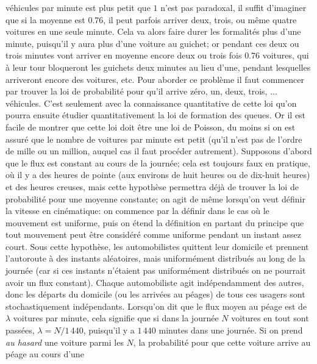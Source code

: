 v\'ehicules par minute est plus petit que $1$ n'est pas paradoxal, il suffit 
d'imaginer que si la moyenne  est $0.76$,  il peut parfois arriver deux, 
trois,  ou m\^eme quatre voitures en une seule minute.  Cela va alors faire  
durer les formalit\'es plus d'une minute,  puisqu'il y aura plus d'une  
voiture au guichet;  or pendant ces deux ou trois minutes vont 
arriver en moyenne encore deux ou trois fois $0.76$ voitures,  qui \`a
leur tour bloqueront les guichets deux minutes au lieu d'une,  pendant
lesquelles arriveront encore des voitures, etc.  
\medskip 
Pour aborder ce probl\`eme il faut commencer par trouver la loi de 
probabilit\'e pour qu'il arrive z\'ero, un, deux, trois, $\ldots$ v\'ehicules. 
C'est seulement avec la connaissance quantitative de cette loi qu'on 
pourra ensuite \'etudier quantitativement la loi de formation des queues. 
\medskip 
 Or il est facile de montrer que cette loi doit \^etre une loi de Poisson, du 
moins si on est assur\'e que le nombre de voitures par minute est petit 
(qu'il n'est pas de l'ordre de mille ou un million, auquel cas il faut 
proc\'eder autrement).  
\medskip 
Supposons d'abord que le flux est constant au cours de la journ\'ee; cela 
est toujours faux en pratique, o\`u il y a des heures de pointe 
(aux environs de huit heures ou de dix-huit heures) et des heures  
creuses, mais cette hypoth\`ese permettra d\'ej\`a de 
trouver la loi de probabilit\'e pour une moyenne constante; on agit de 
m\^eme lorsqu'on veut d\'efinir la vitesse en cin\'ematique: on commence 
par la d\'efinir  dans le cas o\`u le mouvement est uniforme, puis on 
\'etend la d\'efinition en partant du principe que tout mouvement  peut 
\^etre consid\'er\'e comme uniforme pendant un instant assez court. 
\medskip  
Sous cette hypoth\`ese, les automobilistes quittent leur 
domicile et prennent l'autoroute \`a des instants al\'eatoires,  mais 
uniform\'ement distribu\'es au long de la journ\'ee (car si ces instants 
n'\'etaient pas uniform\'ement distribu\'es on ne pourrait avoir un flux 
constant).  Chaque automobiliste agit ind\'ependamment des autres, donc 
les d\'eparts du domicile (ou les arriv\'ees au p\'eages) de tous ces  
usagers sont stochastiquement ind\'ependants.  
\medskip 
Lorsqu'on dit que le flux moyen au p\'eage est de $\lambda$ voitures par 
minute, cela signifie que si dans la journ\'ee $N$ voitures en tout sont 
pass\'ees, $\lambda = N / 1\, 440$, puisqu'il y a $1\, 440$ minutes dans 
une journ\'ee. Si on prend {\it au hasard} une voiture parmi les $N$, 
la probabilit\'e pour que cette voiture arrive au p\'eage au cours d'une  
